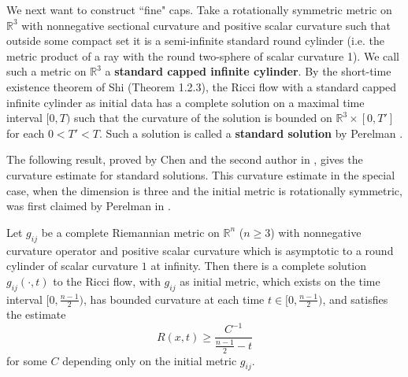 We next want to construct ``fine" caps. Take a rotationally
symmetric metric on $\mathbb{R}^3$ with nonnegative sectional
curvature and positive scalar curvature such that outside some
compact set it is a semi-infinite standard round cylinder (i.e.
the metric product of a ray with the round two-sphere of scalar
curvature 1). We call such a metric on $\mathbb{R}^3$  a
\textbf{standard capped infinite cylinder}. By the short-time existence theorem of Shi
(Theorem 1.2.3), the Ricci flow with a standard capped infinite
cylinder as initial data has a complete solution on a maximal time
interval $[0,T)$ such that the curvature of the solution is
bounded on $\mathbb{R}^3 \times [0,T']$ for each $0<T'<T$.  Such a
solution is called a \textbf{standard
solution} by Perelman \cite{P2}.

The following result, proved by Chen and the second author in
\cite{CZ05F}, gives the curvature estimate for standard solutions.
This curvature estimate in the special case, when the dimension is
three and the initial metric is rotationally symmetric, was first
claimed by Perelman in \cite{P2}.

\begin{proposition}
  \label{prop:cz-asymptotically-cylindrical-standard-solution}

Let $g_{ij}$ be a complete Riemannian metric on $\mathbb{R}^{n}$
($n \geq 3$) with nonnegative curvature operator and positive
scalar curvature which is asymptotic to a round cylinder of scalar
curvature $1$ at infinity.  Then there is a complete solution
$g_{ij}({\cdot,t})$ to the Ricci flow, with $g_{ij}$ as initial
metric, which exists on the time interval $[0,\frac{n-1}{2})$, has
bounded curvature at each time $t \in [0,\frac{n-1}{2})$, and
satisfies the estimate
$$
  R(x,t)\geq \frac{C^{-1}}{\frac{n-1}{2}-t}
$$
for some $C$ depending only on the initial metric $g_{ij}$.
\end{proposition}

